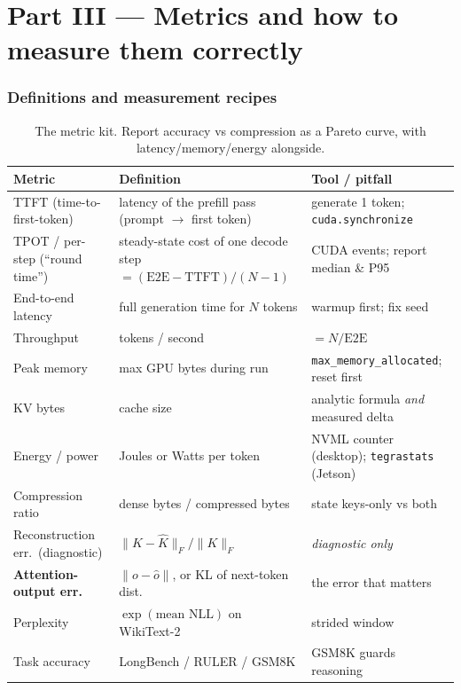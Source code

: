 \documentclass[11pt]{article}
\newcommand{\code}[1]{\texttt{\small #1}}
\begin{document}
\part*{Part III \;---\; Metrics and how to measure them correctly}

\section{Definitions and measurement recipes}

\begin{table}[h]
\centering\small
\renewcommand{\arraystretch}{1.25}
\begin{tabular}{@{}p{3.1cm}p{5.4cm}p{5.0cm}@{}}
\toprule
\textbf{Metric} & \textbf{Definition} & \textbf{Tool / pitfall} \\
\midrule
TTFT (time-to-first-token) & latency of the prefill pass (prompt $\to$ first token) & generate 1 token; \code{cuda.synchronize} \\
TPOT / per-step (``round time'') & steady-state cost of one decode step $=(\text{E2E}-\text{TTFT})/(N{-}1)$ & CUDA events; report median \& P95 \\
End-to-end latency & full generation time for $N$ tokens & warmup first; fix seed \\
Throughput & tokens / second & $=N/\text{E2E}$ \\
Peak memory & max GPU bytes during run & \code{max\_memory\_allocated}; reset first \\
KV bytes & cache size & analytic formula \emph{and} measured delta \\
Energy / power & Joules or Watts per token & NVML counter (desktop); \code{tegrastats} (Jetson) \\
Compression ratio & dense bytes / compressed bytes & state keys-only vs both \\
Reconstruction err.\ (diagnostic) & $\lVert K-\hat K\rVert_F/\lVert K\rVert_F$ & \emph{diagnostic only} \\
\textbf{Attention-output err.} & $\lVert o-\hat o\rVert$, or KL of next-token dist. & the error that matters \\
Perplexity & $\exp(\text{mean NLL})$ on WikiText-2 & strided window~\cite{hfppl} \\
Task accuracy & LongBench / RULER / GSM8K & GSM8K guards reasoning \\
\bottomrule
\end{tabular}
\caption{The metric kit. Report accuracy vs compression as a Pareto curve, with latency/memory/energy alongside.}
\end{table}
\end{document}

